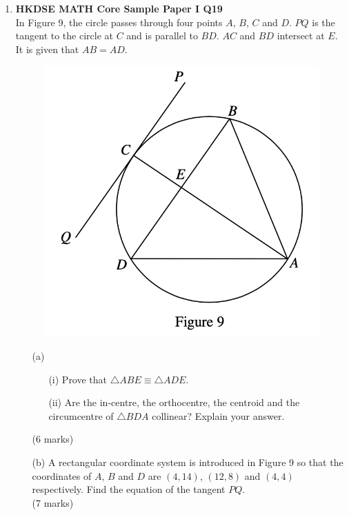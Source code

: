 \documentclass[12pt]{article}
\begin{document}
\begin{enumerate}
	\item \textbf{HKDSE MATH Core Sample Paper I Q19}\\
	In Figure 9, the circle passes through four points $A$, $B$, $C$ and $D$. $PQ$ is the tangent to the circle at $C$ and is parallel to $BD$. $AC$ and $BD$ intersect at $E$. It is given that $AB = AD$.
	\begin{figure}[H]
		\centering
		\includegraphics[width = .5\linewidth]{SPFigure1.9}
	\end{figure}
	\begin{enumerate}
		\item[(a)]
		\begin{enumerate}
			\item[(i)] Prove that $\triangle ABE \equiv \triangle ADE$.
			\item[(ii)] Are the in-centre, the orthocentre, the centroid and the circumcentre of $\triangle BDA$ collinear? Explain your answer.
		\end{enumerate}
		(6 marks)
		\item[(b)] A rectangular coordinate system is introduced in Figure 9 so that the coordinates of $A$, $B$ and $D$ are $(4,14)$, $(12,8)$ and $(4,4)$ respectively. Find the equation of the tangent $PQ$. \\(7 marks)
	\end{enumerate}
\end{enumerate}
\end{document}
